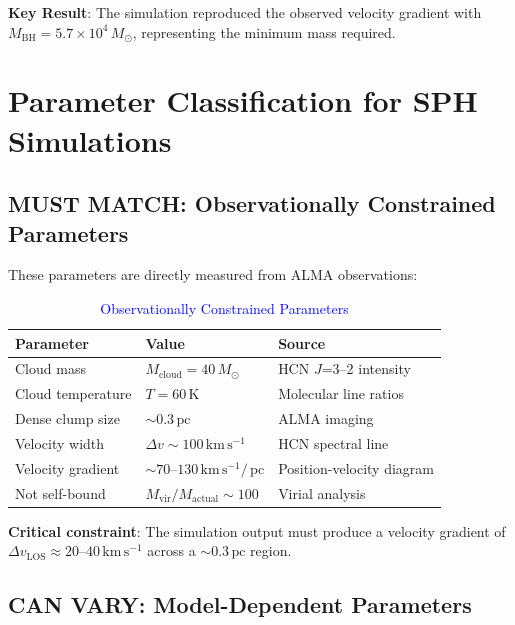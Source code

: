 \documentclass[11pt,a4paper]{article}
\newcommand{\Msun}{M_\odot}
\newcommand{\kms}{\,\mathrm{km\,s^{-1}}}
\newcommand{\pc}{\,\mathrm{pc}}
\begin{document}
\textbf{Key Result}: The simulation reproduced the observed velocity gradient with $M_\mathrm{BH} = 5.7 \times 10^4\,\Msun$, representing the minimum mass required.

\section{Parameter Classification for SPH Simulations}

\subsection{MUST MATCH: Observationally Constrained Parameters}
\label{sec:must_match}

These parameters are directly measured from ALMA observations:

\begin{table}[h]
\centering
\caption{\textcolor{blue}{Observationally Constrained Parameters}}
\begin{tabular}{lll}
\toprule
\textbf{Parameter} & \textbf{Value} & \textbf{Source} \\
\midrule
Cloud mass & $M_\mathrm{cloud} = 40\,\Msun$ & HCN $J$=3--2 intensity \\
Cloud temperature & $T = 60\,\mathrm{K}$ & Molecular line ratios \\
Dense clump size & $\sim 0.3\pc$ & ALMA imaging \\
Velocity width & $\Delta v \sim 100\kms$ & HCN spectral line \\
Velocity gradient & $\sim 70\text{--}130\kms/\pc$ & Position-velocity diagram \\
Not self-bound & $M_\mathrm{vir}/M_\mathrm{actual} \sim 100$ & Virial analysis \\
\bottomrule
\end{tabular}
\end{table}

\textbf{Critical constraint}: The simulation output must produce a velocity gradient of $\Delta v_\mathrm{LOS} \approx 20$--$40\kms$ across a $\sim 0.3\pc$ region.

\subsection{CAN VARY: Model-Dependent Parameters}
\label{sec:can_vary}
\end{document}
